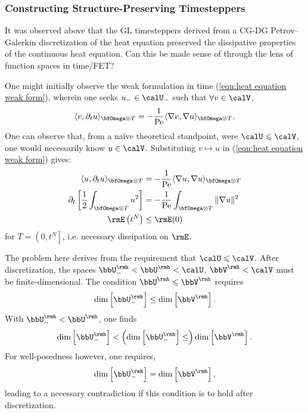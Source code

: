 \subsubsection{Constructing Structure-Preserving Timesteppers}
    It was observed above that the GL timesteppers derived from a CG-DG Petrov–Galerkin discretization of the heat equation preserved the dissipative properties of the continuous heat equation. Can this be made sense of through the lens of function spaces in time/FET?

    One might initially observe the weak formulation in time (\ref{eqn:heat equation weak form}), wherein one seeks $u_{-}  \in  \calU_{-}$ such that $\forall  v  \in  \calV$,
    \begin{equation*}
        \langle v, \partial_{t}u\rangle_{\bfOmega\otimes T}  =   - \frac{1}{\rmPe}\langle\nabla v, \nabla u\rangle_{\bfOmega\otimes T}.
    \end{equation*}
    One can observe that, from a naïve theoretical standpoint, were $\calU  \leqslant  \calV$, one would necessarily know $u  \in  \calV$. Substituting $v  \mapsto  u$ in (\ref{eqn:heat equation weak form}) gives:
    \begin{align}
        \langle u, \partial_{t}u\rangle_{\bfOmega\otimes T}  &=   - \frac{1}{\rmPe}\langle\nabla u, \nabla u\rangle_{\bfOmega\otimes T}  \label{eqn:heat equation dissipation proof 1}  \\
        \partial_{t}\left[\frac{1}{2}\int_{\bfOmega\otimes T}u^{2}\right]  &=   - \frac{1}{\rmPe}\int_{\bfOmega\otimes T}\|\nabla u\|^{2}  \\
        \rmE\left(t^{N}\right)  &\leq  \rmE(0)  \label{eqn:heat equation dissipation proof 3}
    \end{align}
    for $T  =  \left(0, t^{N}\right]$, i.e. necessary dissipation on $\rmE$.
    
    The problem here derives from the requirement that $\calU  \leqslant  \calV$. After discretization, the spaces $\bbU^{\rmh}_{-}  <  \bbU^{\rmh}  <  \calU$, $\bbV^{\rmh}  <  \calV$ must be finite-dimensional. The condition $\bbU^{\rmh}  \leqslant  \bbV^{\rmh}$ requires
    \begin{equation}
        \dim\left[\bbU^{\rmh}_{-}\right]  \leq  \dim\left[\bbV^{\rmh}\right].
    \end{equation}
    With $\bbU^{\rmh}_{-}  <  \bbU^{\rmh}$, one finds
    \begin{equation}
        \dim\left[\bbU^{\rmh}_{-}\right]  <  \left(\dim\left[\bbU^{\rmh}_{-}\right]  \leq\right)  \dim\left[\bbV^{\rmh}\right].
    \end{equation}
    For well-posedness however, one requires,
    \begin{equation}
        \dim\left[\bbU^{\rmh}_{-}\right]  =  \dim\left[\bbV^{\rmh}\right],
    \end{equation}
    leading to a necessary contradiction if this condition is to hold after discretization. \contra

